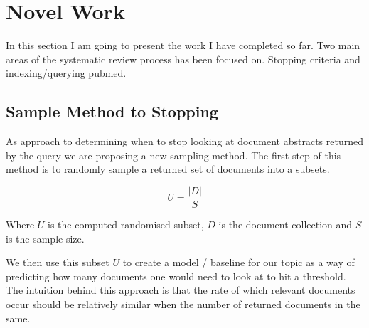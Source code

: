 \chapter{Novel Work}

In this section I am going to present the work I have completed so far. Two main areas of the systematic review process has been focused on. Stopping criteria and indexing/querying pubmed.

\section{Sample Method to Stopping}

As approach to determining when to stop looking at document abstracts returned by the query we are proposing a new sampling method. The first step of this method is to randomly sample a returned set of documents into a subsets.

\begin{equation}
U = \frac{|D|}{S}
\end{equation}

Where $U$ is the computed randomised subset, $D$ is the document collection and $S$ is the sample size.

We then use this subset $U$ to create a model / baseline for our topic as a way of predicting how many documents one would need to look at to hit a threshold. The intuition behind this approach is that the rate of which relevant documents occur should be relatively similar when the number of returned documents in the same.

